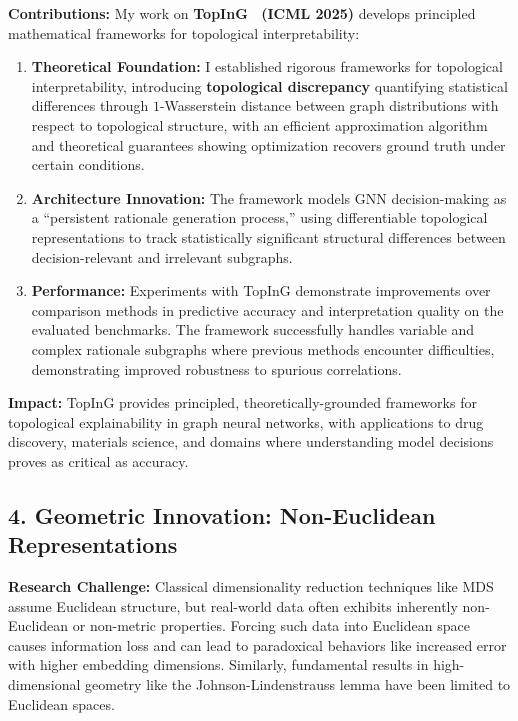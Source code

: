 \documentclass[11pt,letterpaper]{article}
\begin{document}
\textbf{Contributions:} My work on \textbf{TopInG~\cite{topoXGNN} (ICML 2025)} develops principled mathematical frameworks for topological interpretability:

\begin{enumerate}
    \item \textbf{Theoretical Foundation:}
    I established rigorous frameworks for topological interpretability, introducing \textbf{topological discrepancy} quantifying
    statistical differences through
    $1$-Wasserstein distance between graph distributions with respect to topological structure, with an efficient approximation algorithm and theoretical guarantees showing optimization recovers ground truth under certain conditions.

    \item \textbf{Architecture Innovation:} The framework models GNN decision-making as a ``persistent rationale generation process,'' using differentiable topological representations to track statistically significant structural differences between decision-relevant and irrelevant subgraphs.

    \item \textbf{Performance:} Experiments with TopInG demonstrate improvements over comparison methods in predictive accuracy and interpretation quality on the evaluated benchmarks. The framework successfully handles variable and complex rationale subgraphs where previous methods encounter difficulties, demonstrating improved robustness to spurious correlations.
\end{enumerate}

\textbf{Impact:} TopInG provides principled, theoretically-grounded frameworks for topological explainability in graph neural networks, with applications to drug discovery, materials science, and domains where understanding model decisions proves as critical as accuracy.

\vspace{-0.1in}
\subsection*{4. Geometric Innovation: Non-Euclidean Representations}


\textbf{Research Challenge:} Classical dimensionality reduction techniques like MDS assume Euclidean structure, but real-world data often exhibits inherently non-Euclidean or non-metric properties. Forcing such data into Euclidean space causes information loss and can lead to paradoxical behaviors like increased error with higher embedding dimensions. Similarly, fundamental results in high-dimensional geometry like the Johnson-Lindenstrauss lemma have been limited to Euclidean spaces.
\end{document}
